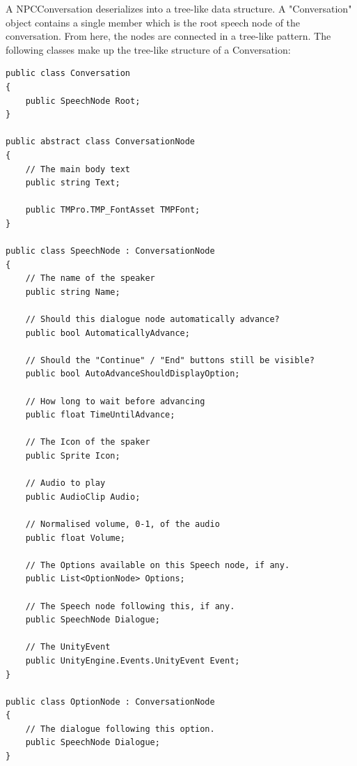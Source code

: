 \documentclass[a4paper,12pt]{article}
\begin{document}
A NPCConversation deserializes into a tree-like data structure. A "Conversation" object contains a single member which is the root speech node of the conversation. From here, the nodes are connected in a tree-like pattern. The following classes make up the tree-like structure of a Conversation:
\bigskip

\begin{lstlisting}
public class Conversation
{
	public SpeechNode Root;
}

public abstract class ConversationNode
{
	// The main body text
	public string Text;
	
	public TMPro.TMP_FontAsset TMPFont;
}

public class SpeechNode : ConversationNode
{
	// The name of the speaker
	public string Name;
	
	// Should this dialogue node automatically advance?
	public bool AutomaticallyAdvance; 
	
	// Should the "Continue" / "End" buttons still be visible?
	public bool AutoAdvanceShouldDisplayOption; 
	
	// How long to wait before advancing
	public float TimeUntilAdvance; 
	
	// The Icon of the spaker
	public Sprite Icon;
	
	// Audio to play
	public AudioClip Audio;
	
	// Normalised volume, 0-1, of the audio
	public float Volume;
	
	// The Options available on this Speech node, if any.
	public List<OptionNode> Options;
	
	// The Speech node following this, if any.	
	public SpeechNode Dialogue; 
	
	// The UnityEvent
	public UnityEngine.Events.UnityEvent Event;
}

public class OptionNode : ConversationNode
{
	// The dialogue following this option.
	public SpeechNode Dialogue;
}
\end{lstlisting}


\newpage
\end{document}

